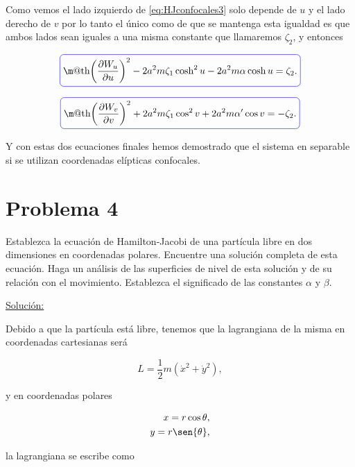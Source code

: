 \documentclass[a4paper,10pt]{article}
\makeatletter
\numberwithin{equation}{section}
\newcommand*{\boxcolor}{blue}
\renewcommand{\boxed}[1]{\textcolor{\boxcolor}{%
\tikz[baseline={([yshift=-1ex]current bounding box.center)}] \node [rectangle, minimum width=1ex,rounded corners,draw] {\normalcolor\m@th$\displaystyle#1$};}}
\makeatother
\begin{document}
Como vemos el lado izquierdo de \eqref{eq:HJconfocales3} solo depende de $u$ y 
el lado derecho de $v$ por lo tanto el único como de que se mantenga esta igualdad 
es que ambos lados sean iguales a una misma constante que llamaremos $\zeta_2$, 
y entonces 

\begin{equation}
 \boxed{\left(\frac{\partial W_u}{\partial u} \right)^2 - 2a^2m\zeta_1\cosh^2{u} - 
 2a^2m\alpha\cosh{u} = \zeta_2.}
\end{equation}

\begin{equation}
 \boxed{ \left(\frac{\partial W_v}{\partial v} \right)^2 + 2a^2m\zeta_1\cos^2{v} + 
 2a^2m\alpha'\cos{v} = - \zeta_2.}
\end{equation}

\vspace{.2cm}

Y con estas dos ecuaciones finales hemos demostrado que el sistema en separable 
si se utilizan coordenadas elípticas confocales.

\section{Problema 4}

Establezca la ecuación de Hamilton-Jacobi de una partícula libre en dos dimensiones 
en coordenadas polares. Encuentre una solución completa de esta ecuación. Haga un 
análisis de las superficies de nivel de esta solución y de su relación con el movimiento. 
Establezca el significado de las constantes $\alpha$ y $\beta$.

\vspace{.3cm}

\underline{Solución:} \vspace{.3cm}

Debido a que la partícula está libre, tenemos que la lagrangiana de la misma 
en coordenadas cartesianas será

\begin{equation}
 L = \frac{1}{2}m(\dot{x}^2 + \dot{y}^2),
\end{equation}

y en coordenadas polares 

\begin{align}
 x = r\cos{\theta}, \\
 y = r\sen{\theta},
\end{align}

la lagrangiana se escribe como 
\end{document}
